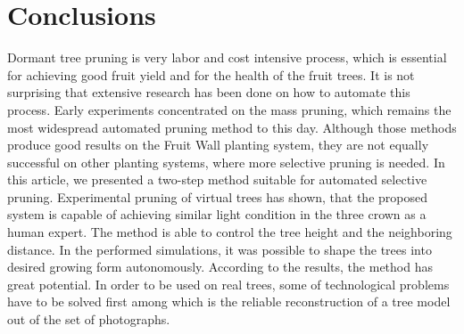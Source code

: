 \section{Conclusions}
Dormant tree pruning is very labor and cost intensive process, which is
essential for achieving good fruit yield and for the health of the fruit
trees. It is not surprising that extensive research has been done on how
to automate this process. Early experiments concentrated on the mass
pruning, which remains the most widespread automated pruning method to
this day. Although those methods produce good results on the Fruit Wall
planting system, they are not equally successful on other planting
systems, where more selective pruning is needed. In this article, we
presented a two-step method suitable for automated selective pruning.
Experimental pruning of virtual trees has shown, that the proposed
system is capable of achieving similar light condition in the three
crown as a human expert. The method is able to control the tree height
and the neighboring distance. In the performed simulations, it was
possible to shape the trees into desired growing form autonomously.
According to the results, the method has great potential. In order to be
used on real trees, some of technological problems have to be solved
first among which is the reliable reconstruction of a tree model out of
the set of photographs.
